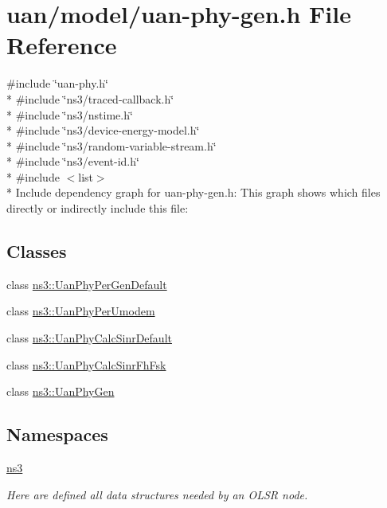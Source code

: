 \hypertarget{uan-phy-gen_8h}{}\section{uan/model/uan-\/phy-\/gen.h File Reference}
\label{uan-phy-gen_8h}
{\ttfamily \#include \char`\"{}uan-\/phy.\+h\char`\"{}}\\*
{\ttfamily \#include \char`\"{}ns3/traced-\/callback.\+h\char`\"{}}\\*
{\ttfamily \#include \char`\"{}ns3/nstime.\+h\char`\"{}}\\*
{\ttfamily \#include \char`\"{}ns3/device-\/energy-\/model.\+h\char`\"{}}\\*
{\ttfamily \#include \char`\"{}ns3/random-\/variable-\/stream.\+h\char`\"{}}\\*
{\ttfamily \#include \char`\"{}ns3/event-\/id.\+h\char`\"{}}\\*
{\ttfamily \#include $<$list$>$}\\*
Include dependency graph for uan-\/phy-\/gen.h\+:
This graph shows which files directly or indirectly include this file\+:
\subsection*{Classes}
\begin{DoxyCompactItemize}
\item 
class \hyperlink{classns3_1_1UanPhyPerGenDefault}{ns3\+::\+Uan\+Phy\+Per\+Gen\+Default}
\item 
class \hyperlink{classns3_1_1UanPhyPerUmodem}{ns3\+::\+Uan\+Phy\+Per\+Umodem}
\item 
class \hyperlink{classns3_1_1UanPhyCalcSinrDefault}{ns3\+::\+Uan\+Phy\+Calc\+Sinr\+Default}
\item 
class \hyperlink{classns3_1_1UanPhyCalcSinrFhFsk}{ns3\+::\+Uan\+Phy\+Calc\+Sinr\+Fh\+Fsk}
\item 
class \hyperlink{classns3_1_1UanPhyGen}{ns3\+::\+Uan\+Phy\+Gen}
\end{DoxyCompactItemize}
\subsection*{Namespaces}
\begin{DoxyCompactItemize}
\item 
 \hyperlink{namespacens3}{ns3}
\begin{DoxyCompactList}\small\item\em Here are defined all data structures needed by an O\+L\+SR node. \end{DoxyCompactList}\end{DoxyCompactItemize}
